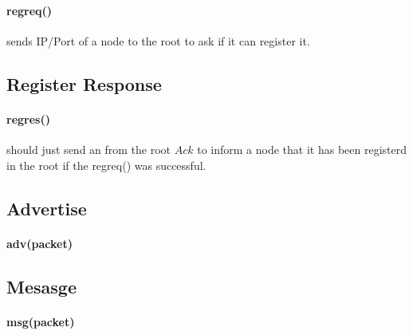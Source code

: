 \documentclass{article}
\begin{document}
\paragraph{reg\underline{\hspace{.05in}}req()} sends IP/Port of a node to the root to ask if it can register it. 
\subsection{Register Response}
\paragraph{reg\underline{\hspace{.05in}}res()} should just send an from the root $Ack$ to inform a node that it has been registerd in the root if the reg\underline{\hspace{.05in}}req() was successful.
\subsection{Advertise}
\paragraph{adv(packet)}
\subsection{Mesasge}
\paragraph{msg(packet)}
\clearpage
\end{document}
